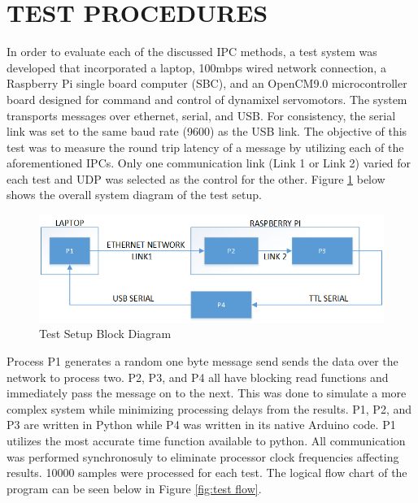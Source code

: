 \section{TEST PROCEDURES}

In order to evaluate each of the discussed IPC methods, a test system was developed that incorporated a laptop, 100mbps wired network connection, a Raspberry Pi single board computer (SBC), and an OpenCM9.0 microcontroller board designed for command and control of dynamixel servomotors. The system transports messages over ethernet, serial, and USB. For consistency, the serial link was set to the same baud rate (9600) as the USB link. The objective of this test was to measure the round trip latency of a message by utilizing each of the aforementioned IPCs. Only one communication link (Link 1 or Link 2) varied for each test and UDP was selected as the control for the other. Figure \ref{fig:test block diag} below shows the overall system diagram of the test setup. 

\begin{figure}[thpb]
 \centering
 \includegraphics[width=1.0\columnwidth]{./images/testblock.png}
  \caption{Test Setup Block Diagram}
  \label{fig:test block diag}
\end{figure} 

Process P1 generates a random one byte message send sends the data over the network to process two. P2, P3, and P4 all have blocking read functions and immediately pass the message on to the next. This was done to simulate a more complex system while minimizing processing delays from the results. P1, P2, and P3 are written in Python while P4 was written in its native Arduino code. P1 utilizes the most accurate time function available to python. All communication was performed synchronosuly to eliminate processor clock frequencies affecting results. 10000 samples were processed for each test. The logical flow chart of the program can be seen below in Figure \ref{fig:test flow}.

